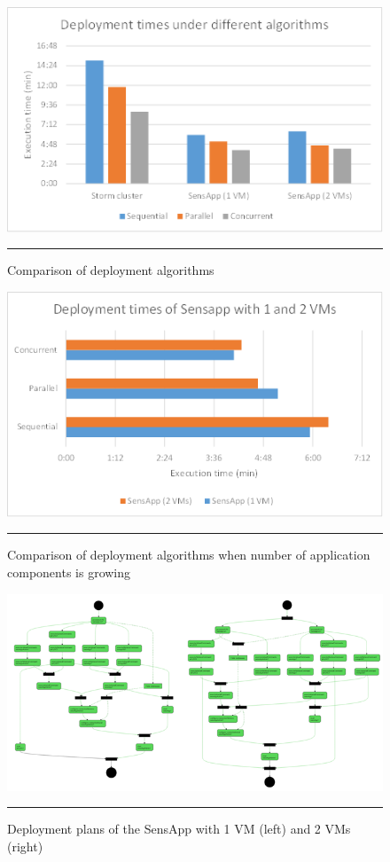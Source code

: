 \noindent 

\begin{figure}[htbp]
	\centering	\includegraphics{./Figures/deployment_comparison}
		\rule{38em}{0.5pt}
	\caption[Comparison of Algorithms]{Comparison of deployment algorithms}
	\label{fig:algorithms}
\end{figure}

\noindent 

\begin{figure}[htbp]
	\centering	\includegraphics{./Figures/deployment_sensapp}
		\rule{38em}{0.5pt}
	\caption[Comparison of SensApp Execution Times]{Comparison of deployment algorithms when number of application components is growing}
	\label{fig:sensapp_times}
\end{figure}

\noindent 

\begin{figure}[htbp]
	\centering	\includegraphics[width=38em]{./Figures/two_vms}
		\rule{38em}{0.5pt}
	\caption[SensApp Deployment Plans]{Deployment plans of the SensApp with 1 VM (left) and 2 VMs (right)}
	\label{fig:sensapp_plans}
\end{figure}

